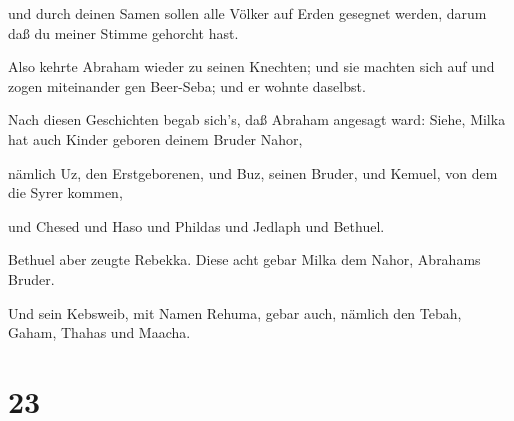  und durch deinen Samen sollen alle Völker auf Erden
gesegnet werden, darum daß du meiner Stimme gehorcht hast.

 Also kehrte Abraham wieder zu seinen Knechten; und sie
machten sich auf und zogen miteinander gen Beer-Seba; und er wohnte
daselbst.

 Nach diesen Geschichten begab sich's, daß Abraham angesagt
ward: Siehe, Milka hat auch Kinder geboren deinem Bruder Nahor,

 nämlich Uz, den Erstgeborenen, und Buz, seinen Bruder, und
Kemuel, von dem die Syrer kommen,

 und Chesed und Haso und Phildas und Jedlaph und Bethuel.

 Bethuel aber zeugte Rebekka. Diese acht gebar Milka dem
Nahor, Abrahams Bruder.

 Und sein Kebsweib, mit Namen Rehuma, gebar auch, nämlich
den Tebah, Gaham, Thahas und Maacha.

\hypertarget{section-22}{%
\section{23}\label{section-22}}


